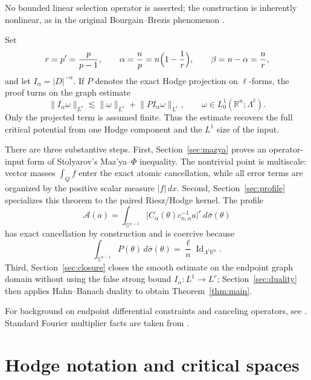 \documentclass[11pt]{amsart}
\numberwithin{equation}{section}
\theoremstyle{definition}
\theoremstyle{remark}
\newcommand{\R}{\mathbb R}
\newcommand{\Sph}{\mathbb S}
\newcommand{\Id}{\operatorname{Id}}
\newcommand{\norm}[1]{\lVert #1\rVert}
\begin{document}
No bounded linear selection operator is asserted; the construction is
inherently nonlinear, as in the original Bourgain--Brezis phenomenon
\cite{BB02,BB03}.

Set
\begin{equation}\label{eq:intro-parameters}
 r=p'=\frac{p}{p-1},\qquad
 \alpha=\frac np=n\Bigl(1-\frac1r\Bigr),\qquad
 \beta=n-\alpha=\frac nr,
\end{equation}
and let $I_\alpha=|D|^{-\alpha}$.  If $P$ denotes the exact Hodge projection
on $\ell$-forms, the proof turns on the graph estimate
\begin{equation}\label{eq:intro-graph}
 \norm{I_\alpha\omega}_{L^r}
 \lesssim \norm{\omega}_{L^1}+\norm{P I_\alpha\omega}_{L^r},
 \qquad \omega\in L^1_0(\R^n;\Lambda^\ell).
\end{equation}
Only the projected term is assumed finite.  Thus the estimate recovers the
full critical potential from one Hodge component and the $L^1$ size of the
input.

There are three substantive steps.  First, Section~\ref{sec:mazya} proves an
operator-input form of Stolyarov's Maz'ya--$\Phi$ inequality.  The nontrivial point is multiscale: vector
masses $\int_Q f$ enter the exact atomic cancellation, while all error terms
are organized by the positive scalar measure $|f|\,dx$.  Second,
Section~\ref{sec:profile} specializes this theorem to the paired Riesz/Hodge
kernel.  The profile
\[
 \mathcal A(a)=\int_{\Sph^{n-1}}
 \bigl|C_\alpha(\theta)c_{n,\alpha}^{-1}a\bigr|^r\,d\bar\sigma(\theta)
\]
has exact cancellation by construction and is coercive because
\begin{equation}\label{eq:intro-averageP}
 \int_{\Sph^{n-1}}P(\theta)\,d\bar\sigma(\theta)
 =\frac{\ell}{n}\Id_{\Lambda^\ell\R^n}.
\end{equation}
Third, Section~\ref{sec:closure} closes the smooth estimate on the endpoint
graph domain without using the false strong bound
$I_\alpha:L^1\to L^r$; Section~\ref{sec:duality} then applies Hahn--Banach
duality to obtain Theorem~\ref{thm:main}.

For background on endpoint differential constraints and canceling operators,
see \cite{BVS14,VanSchaftingen13,VanSchaftingen14,Spector20}.  Standard
Fourier multiplier facts are taken from \cite{Grafakos14,Stein70}.

\section{Hodge notation and critical spaces}\label{sec:notation}
\end{document}
